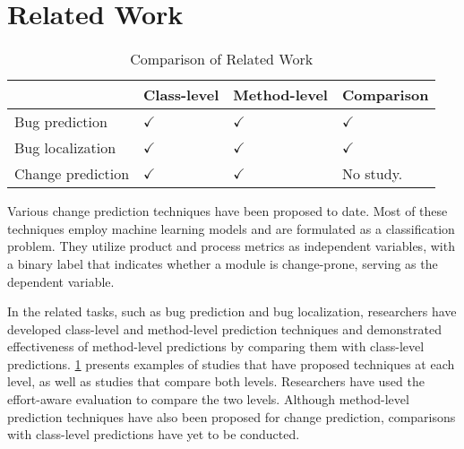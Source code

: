 \section{Related Work}
\label{s:rwork}
\begin{table}[tb]
    \caption{Comparison of Related Work}\label{tab:rwork}
    \centering
        \begin{tabular}{llll} \hline
              & Class-level & Method-level  & Comparison\\ \hline
            Bug prediction  & $\checkmark$ \cite{ckbug,designbug} & $\checkmark$\cite{Hata-method-bug,Giger-method-bug} & $\checkmark$\cite{Hata-method-bug}\\
            Bug localization & $\checkmark$ \cite{Almhana-class-bl,zhou-filebl} & $\checkmark$\cite{ZHANG-method-bl,tsumita-saner2023,YOUM-method-bl,amalgam} & $\checkmark$\cite{tsumita-saner2023} \\
            Change prediction & $\checkmark$ \cite{malhotra-survey,catolino-pre,catolino-ensemble,silva-history,elish-process,catolino-dev,Lu-oo,farah-method-level,catolino-smell,mojeeb-network} & $\checkmark$ \cite{farah-method-level} & No study.\\
            \hline
        \end{tabular}
\end{table}
Various change prediction techniques have been proposed to date\cite{malhotra-survey,catolino-pre,catolino-ensemble,silva-history,elish-process,catolino-dev,Lu-oo,farah-method-level,catolino-smell,mojeeb-network}. 
Most of these techniques employ machine learning models and are formulated as a classification problem.
They utilize product and process metrics as independent variables, with a binary label that indicates whether a module is change-prone, serving as the dependent variable.

In the related tasks, such as bug prediction and bug localization, researchers have developed class-level and method-level prediction techniques\cite{Almhana-class-bl, amalgam,ckbug,designbug,Giger-method-bug,Hata-method-bug,tsumita-saner2023,YOUM-method-bl,ZHANG-method-bl,zhou-filebl} and demonstrated effectiveness of method-level predictions by comparing them with class-level predictions\cite{Hata-method-bug,tsumita-saner2023}.
\cref{tab:rwork} presents examples of studies that have proposed techniques at each level, as well as studies that compare both levels.
Researchers have used the effort-aware evaluation to compare the two levels.
Although method-level prediction techniques have also been proposed for change prediction, comparisons with class-level predictions have yet to be conducted.

